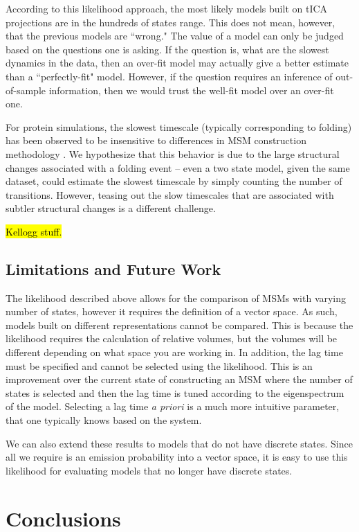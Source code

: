 \documentclass[twocolumn,floatfix,nofootinbib,aps]{revtex4-1}
\begin{document}
According to this likelihood approach, the most likely models built on tICA projections are in the hundreds of states range. This does not mean, however, that the previous models are ``wrong." The value of a model can only be judged based on the questions one is asking. If the question is, what are the slowest dynamics in the data, then an over-fit model may actually give a better estimate than a ``perfectly-fit" model. However, if the question requires an inference of out-of-sample information, then we would trust the well-fit model over an over-fit one.

For protein simulations, the slowest timescale (typically corresponding to folding) has been observed to be insensitive to differences in MSM construction methodology \cite{McGibbon2013Learning, others?}. We hypothesize that this behavior is due to the large structural changes associated with a folding event -- even a two state model, given the same dataset, could estimate the slowest timescale by simply counting the number of transitions. However, teasing out the slow timescales that are associated with subtler structural changes is a different challenge. 

\hl{Kellogg stuff.}

\subsection{Limitations and Future Work}

The likelihood described above allows for the comparison of MSMs with varying number of states, however it requires the definition of a vector space. As such, models built on different representations cannot be compared. This is because the likelihood requires the calculation of relative volumes, but the volumes will be different depending on what space you are working in. In addition, the lag time must be specified and cannot be selected using the likelihood. This is an improvement over the current state of constructing an MSM where the number of states is selected and then the lag time is tuned according to the eigenspectrum of the model. Selecting a lag time {\it a priori} is a much more intuitive parameter, that one typically knows based on the system.

We can also extend these results to models that do not have discrete states. Since all we require is an emission probability into a vector space, it is easy to use this likelihood for evaluating models that no longer have discrete states.

\section{Conclusions}
\end{document}
